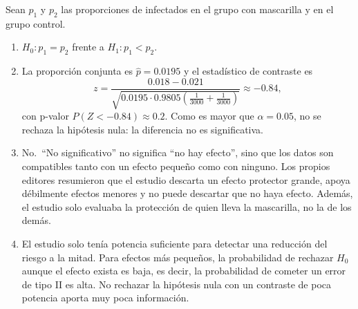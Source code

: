 \documentclass[
  spanish,
  a4paper,
]{scrreport}
\theoremstyle{definition}
\theoremstyle{remark}
\begin{document}
\begin{tcolorbox}[enhanced jigsaw, arc=.35mm, bottomrule=.15mm, bottomtitle=1mm, breakable, colback=white, colbacktitle=quarto-callout-tip-color!10!white, colframe=quarto-callout-tip-color-frame, coltitle=black, left=2mm, leftrule=.75mm, opacityback=0, opacitybacktitle=0.6, rightrule=.15mm, title=\textcolor{quarto-callout-tip-color}{\faLightbulb}\hspace{0.5em}{Solución}, titlerule=0mm, toprule=.15mm, toptitle=1mm]

Sean \(p_1\) y \(p_2\) las proporciones de infectados en el grupo con
mascarilla y en el grupo control.

\begin{enumerate}
\def\labelenumi{\alph{enumi}.}
\item
  \(H_0: p_1=p_2\) frente a \(H_1: p_1<p_2\).
\item
  La proporción conjunta es \(\hat p=0.0195\) y el estadístico de
  contraste es
  \[z=\frac{0.018-0.021}{\sqrt{0.0195\cdot 0.9805\left(\frac{1}{3000}+\frac{1}{3000}\right)}}\approx -0.84,\]
  con p-valor \(P(Z<-0.84)\approx 0.2\). Como es mayor que
  \(\alpha=0.05\), no se rechaza la hipótesis nula: la diferencia no es
  significativa.
\item
  No.~``No significativo'' no significa ``no hay efecto'', sino que los
  datos son compatibles tanto con un efecto pequeño como con ninguno.
  Los propios editores resumieron que el estudio descarta un efecto
  protector grande, apoya débilmente efectos menores y no puede
  descartar que no haya efecto. Además, el estudio solo evaluaba la
  protección de quien lleva la mascarilla, no la de los demás.
\item
  El estudio solo tenía potencia suficiente para detectar una reducción
  del riesgo a la mitad. Para efectos más pequeños, la probabilidad de
  rechazar \(H_0\) aunque el efecto exista es baja, es decir, la
  probabilidad de cometer un error de tipo II es alta. No rechazar la
  hipótesis nula con un contraste de poca potencia aporta muy poca
  información.
\end{enumerate}

\end{tcolorbox}
\end{document}
